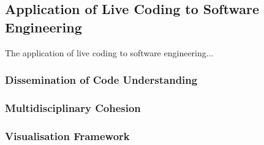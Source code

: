 \subsection{Application of Live Coding to Software Engineering}
The application of live coding to software engineering...

\subsubsection{Dissemination of Code Understanding}


\subsubsection{Multidisciplinary Cohesion}

\subsubsection{Visualisation Framework}





